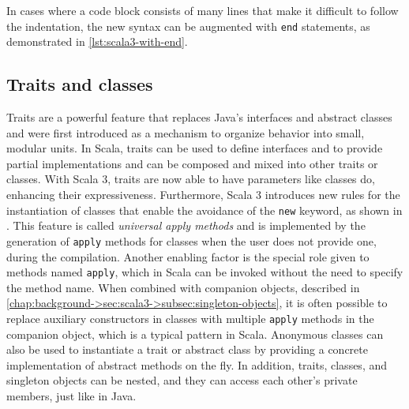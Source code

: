


In cases where a code block consists of many lines that make it difficult to follow the indentation, the new syntax can be augmented with \texttt{end} statements, as demonstrated in \cref{lst:scala3-with-end}.




\subsection{Traits and classes}

Traits are a powerful feature that replaces Java's interfaces and abstract classes and were first introduced as a mechanism to organize behavior into small, modular units\cite{traits}.
%
In Scala, traits can be used to define interfaces and to provide partial implementations and can be composed and mixed into other traits or classes.
%
With Scala 3, traits are now able to have parameters like classes do, enhancing their expressiveness.
%
Furthermore, Scala 3 introduces new rules for the instantiation of classes that enable the avoidance of the \texttt{new} keyword, as shown in .
%
This feature is called \textit{universal apply methods} and is implemented by the generation of \texttt{apply} methods for classes when the user does not provide one, during the compilation.
%
Another enabling factor is the special role given to methods named \texttt{apply}, which in Scala can be invoked without the need to specify the method name.
%
When combined with companion objects, described in \cref{chap:background->sec:scala3->subsec:singleton-objects}, it is often possible to replace auxiliary constructors in classes with multiple \texttt{apply} methods in the companion object, which is a typical pattern in Scala.
%
Anonymous classes can also be used to instantiate a trait or abstract class by providing a concrete implementation of abstract methods on the fly.
%
In addition, traits, classes, and singleton objects can be nested, and they can access each other's private members, just like in Java.


